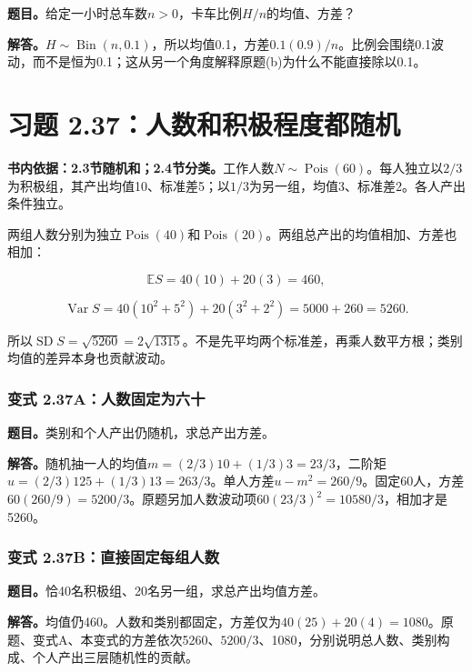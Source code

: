 \documentclass[12pt,a4paper,UTF8,fontset=fandol]{ctexart}
\begin{document}
\textbf{题目。}给定一小时总车数\(n>0\)，卡车比例\(H/n\)的均值、方差？

\textbf{解答。}\(H\sim\operatorname{Bin}(n,0.1)\)，所以均值0.1，方差\(0.1(0.9)/n\)。比例会围绕0.1波动，而不是恒为0.1；这从另一个角度解释原题(b)为什么不能直接除以0.1。

\section{习题
2.37：人数和积极程度都随机}\label{ux4e60ux9898-2.37ux4ebaux6570ux548cux79efux6781ux7a0bux5ea6ux90fdux968fux673a}

\textbf{书内依据：2.3节随机和；2.4节分类。}工作人数\(N\sim\operatorname{Pois}(60)\)。每人独立以\(2/3\)为积极组，其产出均值10、标准差5；以\(1/3\)为另一组，均值3、标准差2。各人产出条件独立。

两组人数分别为独立\(\operatorname{Pois}(40)\)和\(\operatorname{Pois}(20)\)。两组总产出的均值相加、方差也相加：

\[
\mathbb ES=40(10)+20(3)=460,
\]

\[
\operatorname{Var}S=40(10^2+5^2)+20(3^2+2^2)=5000+260=5260.
\]

所以\(\boxed{\operatorname{SD}S=\sqrt{5260}=2\sqrt{1315}}\)。不是先平均两个标准差，再乘人数平方根；类别均值的差异本身也贡献波动。

\subsubsection{变式
2.37A：人数固定为六十}\label{ux53d8ux5f0f-2.37aux4ebaux6570ux56faux5b9aux4e3aux516dux5341}

\textbf{题目。}类别和个人产出仍随机，求总产出方差。

\textbf{解答。}随机抽一人的均值\(m=(2/3)10+(1/3)3=23/3\)，二阶矩\(u=(2/3)125+(1/3)13=263/3\)。单人方差\(u-m^2=260/9\)。固定60人，方差\(60(260/9)=5200/3\)。原题另加人数波动项\(60(23/3)^2=10580/3\)，相加才是5260。

\subsubsection{变式
2.37B：直接固定每组人数}\label{ux53d8ux5f0f-2.37bux76f4ux63a5ux56faux5b9aux6bcfux7ec4ux4ebaux6570}

\textbf{题目。}恰40名积极组、20名另一组，求总产出均值方差。

\textbf{解答。}均值仍460。人数和类别都固定，方差仅为\(40(25)+20(4)=1080\)。原题、变式A、本变式的方差依次5260、\(5200/3\)、1080，分别说明总人数、类别构成、个人产出三层随机性的贡献。
\end{document}
